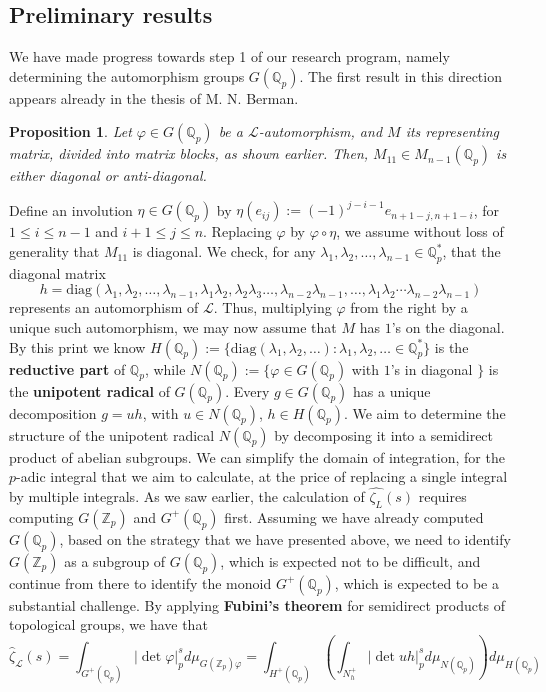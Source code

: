 \documentclass[12pt]{article}
\newtheorem{proposition}[theorem]{Proposition}
\begin{document}
\subsection{Preliminary results}
\label{preliminary.results}
We have made progress towards step 1 of our research program, namely determining the automorphism groups $G(\mathbb{Q}_p)$.
The first result in this direction appears already in the thesis of M. N. Berman\cite[Prop. 3.6]{Berman}.
\begin{proposition}
Let $\varphi\in{G(\mathbb{Q}_p)}$ be a $\mathcal{L}$-automorphism, and $M$ its representing matrix, divided into matrix blocks, as shown earlier. Then, $M_{11}\in{M}_{n-1}(\mathbb{Q}_p)$ is either diagonal or anti-diagonal.
\end{proposition}
Define an involution $\eta\in{G(\mathbb{Q}_p)}$ by $\eta(e_{ij}):=(-1)^{j-i-1}e_{n+1-j,n+1-i}$, for $1\leq{i}\leq{n-1}$ and ${i+1}\leq{j}\leq{n}$. Replacing $\varphi$ by $\varphi\circ\eta$, we assume without loss of generality that $M_{11}$ is diagonal.
We check, for any $\lambda_{1},\lambda_{2},\dots,\lambda_{n-1}\in\mathbb{Q}_{p}^{\ast}$, that the diagonal matrix \[h=\mathrm{diag}(\lambda_{1},\lambda_{2},\dots,\lambda_{n-1},\lambda_{1}\lambda_{2},\lambda_{2}\lambda_{3}\dots,\lambda_{n-2}\lambda_{n-1},\dots,\lambda_{1}\lambda_{2}\cdots\lambda_{n-2}\lambda_{n-1})\]
represents an automorphism of $\mathcal{L}$. Thus, multiplying $\varphi$ from the right by a unique such automorphism, we may now assume that $M$ has $1$'s on the diagonal. By this print we know
$H(\mathbb{Q}_{p}):=\{\mathrm{diag}(\lambda_{1},\lambda_{2},\dots) : \lambda_{1},\lambda_{2},\dots\in\mathbb{Q}_{p}^{\ast}\}$ is the \textbf{reductive part} of $\mathbb{Q}_{p}$, while $N(\mathbb{Q}_{p}):=\{\varphi\in{G(\mathbb{Q}_{p})}$ with $1$'s
 in diagonal $\}$ is the \textbf{unipotent radical} of $G(\mathbb{Q}_{p})$.
Every $g\in{G(\mathbb{Q}_{p})}$ has a unique decomposition $g=uh$, with $u\in{N}(\mathbb{Q}_{p})$, $h\in{H(\mathbb{Q}_{p})}$. We aim to determine the structure of the unipotent radical $N(\mathbb{Q}_p)$ by decomposing it into a semidirect product of abelian subgroups. 
We can simplify the domain of integration, for the $p$-adic integral that we aim to calculate, at the price of replacing a single integral by multiple integrals. As we saw earlier, the calculation of $\hat{\zeta_{L}}(s)$ requires computing $G(\mathbb{Z}_p)$ and $G^+(\mathbb{Q}_p)$ first. Assuming we have already computed $G(\mathbb{Q}_p)$, based on the strategy that we have presented above, we need to identify $G(\mathbb{Z}_p)$ as a subgroup of $G(\mathbb{Q}_p)$, which is expected not to be difficult, and continue from there to identify the monoid $G^+(\mathbb{Q}_p)$, which is expected to be a substantial challenge. By applying \textbf{Fubini's theorem} for semidirect products of topological groups, we have that \[\hat\zeta_{\mathcal{L}}(s)=\displaystyle\int_{G^+(\mathbb{Q}_p)}|\det\varphi|_p^sd\mu_{G(\mathbb{Z}_p)\varphi}=\displaystyle\int_{H^+(\mathbb{Q}_p)}\left(\displaystyle\int_{N_{h}^+}|\det{uh}|_p^sd\mu_{N(\mathbb{Q}_p)}\right)d\mu_{H(\mathbb{Q}_p)}\]
\end{document}
